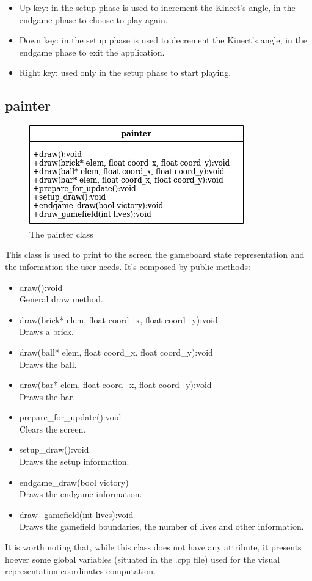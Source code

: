 \documentclass[]{article}
\begin{document}
\begin{itemize}
			 \begin{itemize}
				\item Up key: in the setup phase is used to increment the Kinect's angle, in the endgame phase to choose to play again.
				\item Down key: in the setup phase is used to decrement the Kinect's angle, in the endgame phase to exit the application.
				\item Right key: used only in the setup phase to start playing. 
			 \end{itemize}
	\end{itemize}
\newpage
\subsection{painter}
\begin{figure}[h!]
    \centering
    \includegraphics[scale=0.5]{painter.jpg}
    \caption{The painter class}
    \label{fig:painter class diagram }
\end{figure}
This class is used to print to the screen the gameboard state representation and the information the user needs. It's composed by public methods:
\begin{itemize}
		\item draw():void \\ General draw method.
		\item draw(brick* elem, float coord\_x, float coord\_y):void\\ Draws a brick.
		\item draw(ball* elem, float coord\_x, float coord\_y):void\\ Draws the ball.
		\item draw(bar* elem, float coord\_x, float coord\_y):void\\ Draws the bar.
		\item prepare\_for\_update():void\\ Clears the screen.
		\item setup\_draw():void\\Draws the setup information.
		\item endgame\_draw(bool victory)\\Draws the endgame information.
		\item draw\_gamefield(int lives):void\\Draws the gamefield boundaries, the number of lives and other information.
	\end{itemize}
It is worth noting that, while this class does not have any attribute, it presents hoever some global variables (situated in the .cpp file) used for the visual representation coordinates computation.
\newpage
\end{document}
